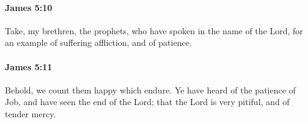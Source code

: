 		\paragraph{James 5:10} %
			\label{JAMES-5-10}

			Take, my brethren, the prophets, who have spoken in the name of the Lord, for an example of suffering affliction, and of patience.

			\begin{framed}
			\scriptsize
				\begin{compactdesc}
					\item[SBLG] 
				\end{compactdesc}
			\end{framed}

		\paragraph{James 5:11} %
			\label{JAMES-5-11}

			Behold, we count them happy which endure. Ye have heard of the patience of Job, and have seen the end of the Lord; that the Lord is very pitiful, and of tender mercy.


